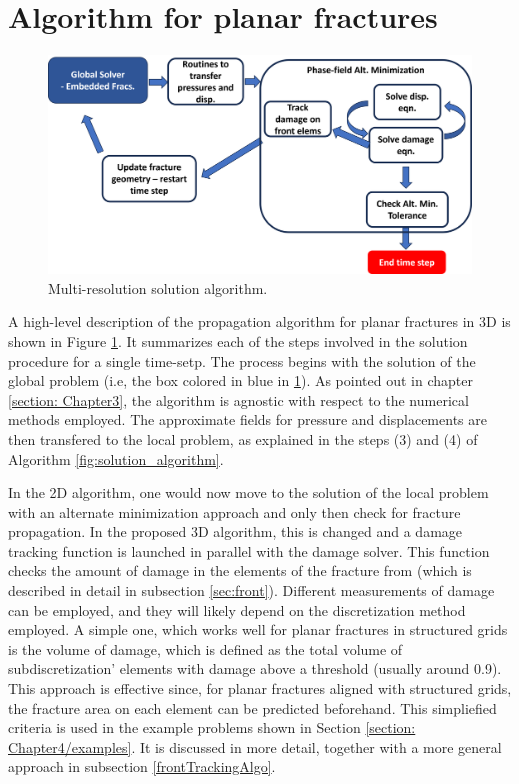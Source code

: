 \section{Algorithm for planar fractures}
\label{section: Chapter4/algo}

\begin{figure}[h]
    \centering
    \includegraphics[width=\linewidth]{Chapter4/figures/planar3D_algorithm.png}
    \caption{Multi-resolution solution algorithm.}
    \label{fig:MR_planar_algo}
\end{figure}

A high-level description of the propagation algorithm for planar fractures in 3D is shown in Figure \ref{fig:MR_planar_algo}. It summarizes each of the steps involved in the solution procedure for a single time-setp. The process begins with the solution of the global problem (i.e, the box colored in blue in \ref{fig:MR_planar_algo}). As pointed out in chapter \ref{section: Chapter3}, the algorithm is agnostic with respect to the numerical methods employed. The approximate fields for pressure and displacements are then transfered to the local problem, as explained in the steps (3) and (4) of Algorithm \ref{fig:solution_algorithm}.

In the 2D algorithm, one would now move to the solution of the local problem with an alternate minimization approach and only then check for fracture propagation. In the proposed 3D algorithm, this is changed and a damage tracking function is launched in parallel with the damage solver. This function checks the amount of damage in the elements of the fracture from (which is described in detail in subsection \ref{sec:front}). Different measurements of damage can be employed, and they will likely depend on the discretization method employed. A simple one, which works well for planar fractures in structured grids is the volume of damage, which is defined as the total volume of subdiscretization' elements with damage above a threshold (usually around 0.9). This approach is effective since, for planar fractures aligned with structured grids, the fracture area on each element can be predicted beforehand. This simpliefied criteria is used in the example problems shown in Section \ref{section: Chapter4/examples}. It is discussed in more detail, together with a more general approach in subsection \ref{frontTrackingAlgo}.


